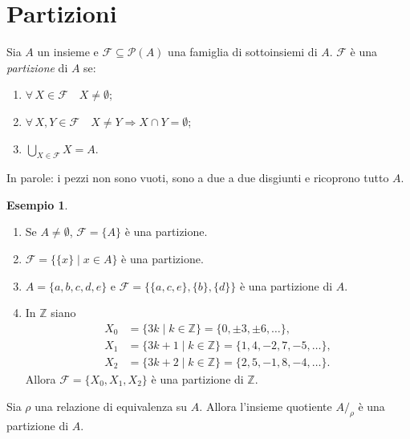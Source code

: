 \documentclass[11pt,a4paper]{article}
\theoremstyle{definition}
\newtheorem*{esempio}{Esempio}
\begin{document}
\section{Partizioni}

\begin{definizione}
Sia $A$ un insieme e $\mathcal{F} \subseteq \mathcal{P}(A)$ una famiglia di
sottoinsiemi di $A$. $\mathcal{F}$ è una \emph{partizione} di $A$ se:
\begin{enumerate}
    \item $\forall\, X \in \mathcal{F} \quad X \neq \emptyset$;
    \item $\forall\, X, Y \in \mathcal{F} \quad X \neq Y \Rightarrow
          X \cap Y = \emptyset$;
    \item $\displaystyle \bigcup_{X \in \mathcal{F}} X = A$.
\end{enumerate}
\end{definizione}

In parole: i pezzi non sono vuoti, sono a due a due disgiunti e ricoprono
tutto $A$.

\begin{esempio}
\leavevmode
\begin{enumerate}
    \item Se $A \neq \emptyset$, $\mathcal{F} = \{A\}$ è una partizione.
    \item $\mathcal{F} = \{\{x\} \mid x \in A\}$ è una partizione.
    \item $A = \{a, b, c, d, e\}$ e
          $\mathcal{F} = \{\{a, c, e\}, \{b\}, \{d\}\}$ è una partizione
          di $A$.
    \item In $\mathbb{Z}$ siano
          \begin{align*}
          X_0 &= \{3k \mid k \in \mathbb{Z}\} = \{0, \pm 3, \pm 6, \dots\},\\
          X_1 &= \{3k + 1 \mid k \in \mathbb{Z}\}
                = \{1, 4, -2, 7, -5, \dots\},\\
          X_2 &= \{3k + 2 \mid k \in \mathbb{Z}\}
                = \{2, 5, -1, 8, -4, \dots\}.
          \end{align*}
          Allora $\mathcal{F} = \{X_0, X_1, X_2\}$ è una partizione di
          $\mathbb{Z}$.
\end{enumerate}
\end{esempio}

\begin{proposizione}[A]
Sia $\rho$ una relazione di equivalenza su $A$. Allora l'insieme quotiente
$A/_\rho$ è una partizione di $A$.
\end{proposizione}
\end{document}
